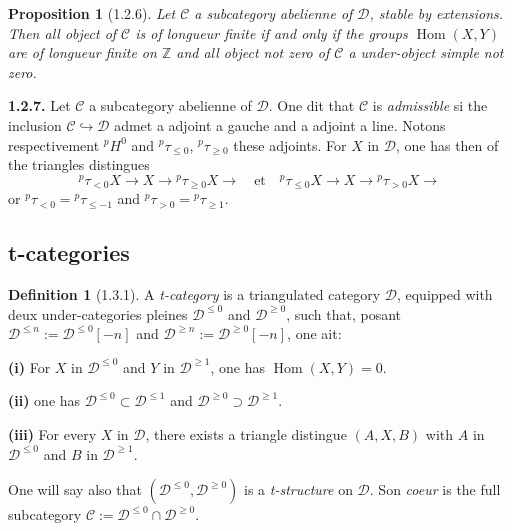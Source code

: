 \documentclass[12pt,a4paper]{article}
\theoremstyle{plain}
\newtheorem{proposition}[theorem]{Proposition}
\theoremstyle{definition}
\newtheorem{definition}[theorem]{Definition}
\theoremstyle{remark}
\DeclareMathOperator{\Hom}{Hom}
\newcommand{\ZZ}{\mathbb{Z}}
\newcommand{\cC}{\mathcal{C}}
\newcommand{\cD}{\mathcal{D}}
\begin{document}
\begin{proposition}[1.2.6]
Let $\cC$ a subcategory abelienne of $\cD$, stable by extensions. Then all object of $\cC$ is of longueur finite if and only if the groups $\Hom(X, Y)$ are of longueur finite on $\ZZ$ and all object not zero of $\cC$ a under-object simple not zero.
\end{proposition}

\smallskip

\noindent
\textbf{1.2.7.} Let $\cC$ a subcategory abelienne of $\cD$. One dit that $\cC$ is \emph{admissible} si the inclusion $\cC \hookrightarrow \cD$ admet a adjoint a gauche and a adjoint a line. Notons respectivement ${}^{p}H^{0}$ and ${}^{p}\tau_{\leq 0}$, ${}^{p}\tau_{\geq 0}$ these adjoints. For $X$ in $\cD$, one has then of the triangles distingues
\[
{}^{p}\tau_{<0}X \to X \to {}^{p}\tau_{\geq 0}X \to
\quad\text{et}\quad
{}^{p}\tau_{\leq 0}X \to X \to {}^{p}\tau_{>0}X \to
\]
or ${}^{p}\tau_{<0} = {}^{p}\tau_{\leq -1}$ and ${}^{p}\tau_{>0} = {}^{p}\tau_{\geq 1}$.

\subsection{t-categories}

\begin{definition}[1.3.1]
A \emph{t-category} is a triangulated category $\cD$, equipped with deux under-categories pleines $\cD^{\leq 0}$ and $\cD^{\geq 0}$, such that, posant $\cD^{\leq n} := \cD^{\leq 0}[-n]$ and $\cD^{\geq n} := \cD^{\geq 0}[-n]$, one ait:

\smallskip

\noindent
\textbf{(i)} For $X$ in $\cD^{\leq 0}$ and $Y$ in $\cD^{\geq 1}$, one has $\Hom(X, Y) = 0$.

\noindent
\textbf{(ii)} one has $\cD^{\leq 0} \subset \cD^{\leq 1}$ and $\cD^{\geq 0} \supset \cD^{\geq 1}$.

\noindent
\textbf{(iii)} For every $X$ in $\cD$, there exists a triangle distingue $(A, X, B)$ with $A$ in $\cD^{\leq 0}$ and $B$ in $\cD^{\geq 1}$.
\end{definition}

One will say also that $(\cD^{\leq 0}, \cD^{\geq 0})$ is a \emph{t-structure} on $\cD$. Son \emph{coeur} is the full subcategory $\cC := \cD^{\leq 0} \cap \cD^{\geq 0}$.

\smallskip
\end{document}
